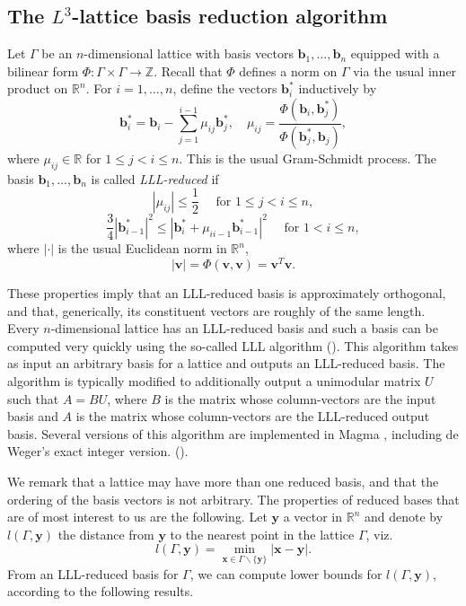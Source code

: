 
\subsection{The $L^3$-lattice basis reduction algorithm}
\label{subsec:LLL}

Let $\Gamma$ be an $n$-dimensional lattice with basis vectors $\mathbf{b}_1, \dots, \mathbf{b}_n$ equipped with a bilinear form $\Phi: \Gamma \times \Gamma \to \mathbb{Z}$. Recall that $\Phi$ defines a norm on $\Gamma$ via the usual inner product on $\mathbb{R}^n$. For $i = 1, \dots, n$, define the vectors $\mathbf{b}_i^*$ inductively by
\[\mathbf{b}_i^* = \mathbf{b}_i - \sum_{j=1}^{i-1}\mu_{ij}\mathbf{b}_j^*, \quad \mu_{ij} = \frac{\Phi(\mathbf{b}_i,\mathbf{b}_j^*)}{\Phi(\mathbf{b}_j^*,\mathbf{b}_j)},\]
where $\mu_{ij} \in \mathbb{R}$ for $1\leq j < i \leq n$. This is the usual Gram-Schmidt process. The basis $\mathbf{b}_1,\dots, \mathbf{b}_n$ is called \textit{LLL-reduced} if
\[|\mu_{ij}| \leq \frac{1}{2} \quad \text{ for } 1\leq j < i \leq n, \]
\[\frac{3}{4}|\mathbf{b}_{i-1}^*|^2 \leq |\mathbf{b}_i^* + \mu_{ii-1}\mathbf{b}_{i-1}^*|^2 \quad \text{ for } 1 <i \leq n,\]
where $| \cdot |$ is the usual Euclidean norm in $\mathbb{R}^n$, 
\[|\mathbf{v}| = \Phi(\mathbf{v},\mathbf{v}) = \mathbf{v}^{T}\mathbf{v}.\]

These properties imply that an LLL-reduced basis is approximately orthogonal, and that, generically, its constituent vectors are roughly of the same length. Every $n$-dimensional lattice has an LLL-reduced basis and such a basis can be computed very quickly using the so-called LLL algorithm (). This algorithm takes as input an arbitrary basis for a lattice and outputs an LLL-reduced basis. The algorithm is typically modified to additionally output a unimodular matrix $U$ such that $A = BU$, where $B$ is the matrix whose column-vectors are the input basis and $A$ is the matrix whose column-vectors are the LLL-reduced output basis. Several versions of this algorithm are implemented in Magma , including de Weger's exact integer version. ().

We remark that a lattice may have more than one reduced basis, and that the ordering of the basis vectors is not arbitrary. The properties of reduced bases that are of most interest to us are the following. Let $\mathbf{y}$ a vector in $\mathbb{R}^n$ and denote by $l(\Gamma,\mathbf{y})$ the distance from $\mathbf{y}$ to the nearest point in the lattice $\Gamma$, viz.
\[l(\Gamma,\mathbf{y}) = \min_{\mathbf{x} \in \Gamma \backslash\{\mathbf{y}\}} |\mathbf{x} - \mathbf{y}|.\]
From an LLL-reduced basis for $\Gamma$, we can compute lower bounds for $l(\Gamma,\mathbf{y})$, according to the following results. 

